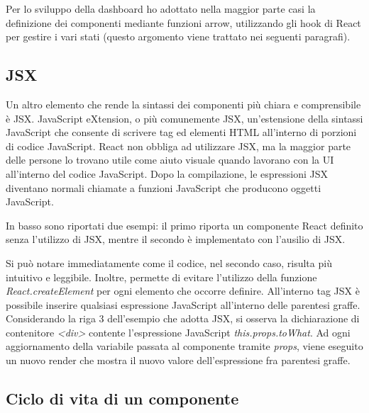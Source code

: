 Per lo sviluppo della dashboard ho adottato nella maggior parte casi la definizione dei componenti mediante funzioni arrow, utilizzando gli hook di React per gestire i vari stati (questo argomento viene trattato nei seguenti paragrafi).

\subsection{JSX}
\label{sec:jsx}

Un altro elemento che rende la sintassi dei componenti più chiara e comprensibile è JSX. JavaScript eXtension, o più comunemente JSX, un’estensione della sintassi JavaScript che consente di scrivere tag ed elementi HTML all'interno di porzioni di codice JavaScript. React non obbliga ad utilizzare JSX, ma la maggior parte delle persone lo trovano utile come aiuto visuale quando lavorano con la UI all'interno del codice JavaScript. Dopo la compilazione, le espressioni JSX diventano normali chiamate a funzioni JavaScript che producono oggetti JavaScript.

In basso sono riportati due esempi: il primo riporta un componente React definito senza l'utilizzo di JSX, mentre il secondo è implementato con l'ausilio di JSX.





Si può notare immediatamente come il codice, nel secondo caso, risulta più intuitivo e leggibile. Inoltre, permette di evitare l'utilizzo della funzione \textit{React.createElement} per ogni elemento che occorre definire. 
All'interno tag JSX è possibile inserire qualsiasi espressione JavaScript all'interno delle parentesi graffe. Considerando la riga 3 dell'esempio che adotta JSX, si osserva la dichiarazione di contenitore \textit{<div>} contente l'espressione JavaScript \textit{this.props.toWhat}. Ad ogni aggiornamento della variabile passata al componente tramite \textit{props}, viene eseguito un nuovo render che mostra il nuovo valore dell'espressione fra parentesi graffe.

\subsection{Ciclo di vita di un componente}
\label{sec:ciclo di vita di un componente}

